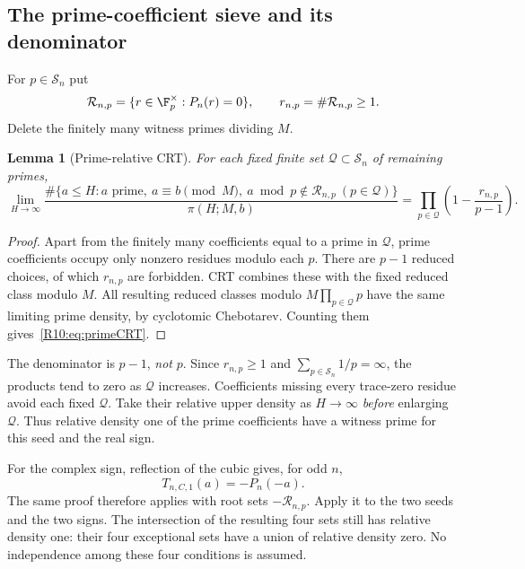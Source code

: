 \documentclass[11pt,a4paper]{article}
\newtheorem{lemma}[theorem]{Lemma}\newtheorem{proposition}[theorem]{Proposition}
\theoremstyle{definition}\newtheorem{definition}[theorem]{Definition}
\theoremstyle{remark}\newtheorem{remark}[theorem]{Remark}
\begin{document}
\subsection{The prime-coefficient sieve and its denominator}\label{R10:sec:sieve}

For $p\in\mathcal S_n$ put
\[
 \mathcal R_{n,p}=\{r\in\F_p^\times:P_n(r)=0\},\qquad
 r_{n,p}=\#\mathcal R_{n,p}\ge1.
\]
Delete the finitely many witness primes dividing $M$.

\begin{lemma}[Prime-relative CRT]\label{R10:lem:primeCRT}
For each fixed finite set $\mathcal Q\subset\mathcal S_n$ of remaining primes,
\begin{equation}\label{R10:eq:primeCRT}
 \lim_{H\to\infty}
 \frac{\#\{a\le H:a\text{ prime},\ a\equiv b\pmod M,\
                   a\bmod p\notin\mathcal R_{n,p}\ (p\in\mathcal Q)\}}
      {\pi(H;M,b)}
       =\prod_{p\in\mathcal Q}\left(1-\frac{r_{n,p}}{p-1}\right).
\end{equation}
\end{lemma}
\begin{proof}
Apart from the finitely many coefficients equal to a prime in $\mathcal Q$,
prime coefficients occupy only nonzero residues modulo each $p$.
There are $p-1$ reduced choices, of which $r_{n,p}$ are forbidden.
CRT combines these with the fixed reduced class modulo $M$.
All resulting reduced classes modulo $M\prod_{p\in\mathcal Q}p$
have the same limiting prime density, by cyclotomic Chebotarev.
Counting them gives~\eqref{R10:eq:primeCRT}.
\end{proof}

The denominator is $p-1$, \emph{not} $p$.
Since $r_{n,p}\ge1$ and $\sum_{p\in\mathcal S_n}1/p=\infty$, the products
tend to zero as $\mathcal Q$ increases.
Coefficients missing every trace-zero residue avoid each fixed
$\mathcal Q$. Take their relative upper density as $H\to\infty$
\emph{before} enlarging $\mathcal Q$.
Thus relative density one of the prime coefficients have a witness
prime for this seed and the real sign.

For the complex sign, reflection of the cubic gives, for odd $n$,
\begin{equation}\label{R10:eq:reflection}
                           T_{n,C,1}(a)=-P_n(-a).
\end{equation}
The same proof therefore applies with root sets $-\mathcal R_{n,p}$.
Apply it to the two seeds and the two signs.
The intersection of the resulting four sets still has relative density
one: their four exceptional sets have a union of relative density zero.
No independence among these four conditions is assumed.
\end{document}
